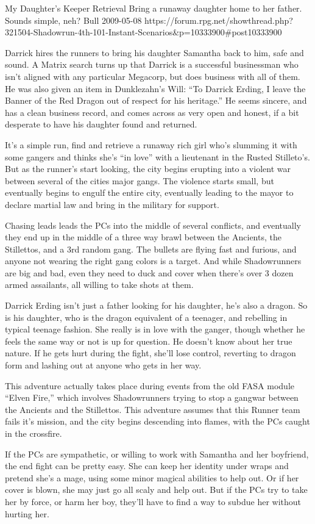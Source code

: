 \begin{scenario}{My Daughter's Keeper}
	{Retrieval}
	{Bring a runaway daughter home to her father. Sounds simple, neh?}
	{Bull}
	{2009-05-08}
	{https://forum.rpg.net/showthread.php?321504-Shadowrun-4th-101-Instant-Scenarios\&p=10333900\#post10333900}

  Darrick hires the runners to bring his daughter Samantha back to him, safe and sound. A Matrix search turns up that Darrick is a successful businessman who isn't aligned with any particular Megacorp, but does business with all of them. He was also given an item in Dunklezahn's Will: ``To Darrick Erding, I leave the Banner of the Red Dragon out of respect for his heritage.'' He seems sincere, and has a clean business record, and comes across as very open and honest, if a bit desperate to have his daughter found and returned.

\synopsis  It's a simple run, find and retrieve a runaway rich girl who's slumming it with some gangers and thinks she's ``in love'' with a lieutenant in the Rusted Stilleto's. But as the runner's start looking, the city begins erupting into a violent war between several of the cities major gangs. The violence starts small, but eventually begins to engulf the entire city, eventually leading to the mayor to declare martial law and bring in the military for support.

Chasing leads leads the PCs into the middle of several conflicts, and eventually they end up in the middle of a three way brawl between the Ancients, the Stillettos, and a 3rd random gang. The bullets are flying fast and furious, and anyone not wearing the right gang colors is a target. And while Shadowrunners are big and bad, even they need to duck and cover when there's over 3 dozen armed assailants, all willing to take shots at them.

\notes Darrick Erding isn't just a father looking for his daughter, he's also a dragon. So is his daughter, who is the dragon equivalent of a teenager, and rebelling in typical teenage fashion. She really is in love with the ganger, though whether he feels the same way or not is up for question. He doesn't know about her true nature. If he gets hurt during the fight, she'll lose control, reverting to dragon form and lashing out at anyone who gets in her way.

This adventure actually takes place during events from the old FASA module ``Elven Fire,'' which involves Shadowrunners trying to stop a gangwar between the Ancients and the Stillettos. This adventure assumes that this Runner team fails it's mission, and the city begins descending into flames, with the PCs caught in the crossfire.

If the PCs are sympathetic, or willing to work with Samantha and her boyfriend, the end fight can be pretty easy. She can keep her identity under wraps and pretend she's a mage, using some minor magical abilities to help out. Or if her cover is blown, she may just go all scaly and help out. But if the PCs try to take her by force, or harm her boy, they'll have to find a way to subdue her without hurting her.

\end{scenario}